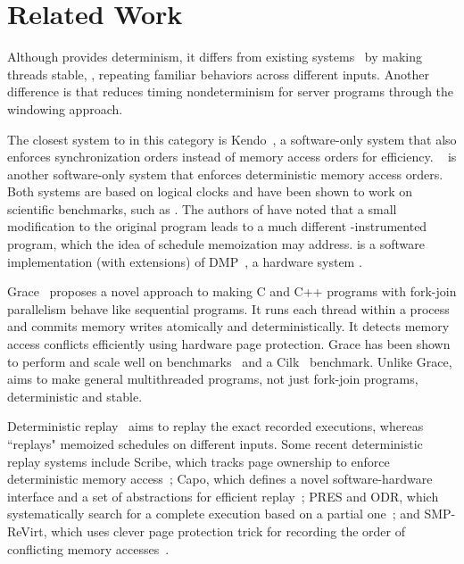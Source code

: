 \section{Related Work} \label{sec:tern-related}

 Although \tern provides determinism, it 
differs from existing \dmt systems~\cite{dmp:asplos09, coredet:asplos10, 
kendo:asplos09} by making threads stable, \ie, repeating familiar behaviors 
across different inputs. Another difference is that \tern reduces timing 
nondeterminism for server programs through the windowing approach.

The closest system to \tern in this category is
Kendo~\cite{kendo:asplos09}, a software-only \dmt system that also
enforces synchronization orders instead of memory access orders for
efficiency.  \coredet~\cite{coredet:asplos10} is another software-only \dmt
system that enforces deterministic memory access orders.  Both systems are
based on logical clocks and have been shown to work on scientific
benchmarks, such as \splash.  The authors of \coredet have noted that a small
modification to the original program leads to a much different
\coredet-instrumented program, which the idea of schedule memoization may
address.  \coredet is a software implementation (with extensions) of
DMP~\cite{dmp:asplos09}, a hardware \dmt system .

Grace~\cite{grace:oopsla09} proposes a novel approach to making C and C++
programs with fork-join parallelism behave like sequential programs.  It
runs each thread within a process and commits memory writes atomically and
deterministically.  It detects memory access conflicts efficiently using
hardware page protection.  Grace has been shown to perform and scale well
on \phoenix benchmarks~\cite{phoenix-benchmarks} and a Cilk~\cite{cilk}
benchmark.  Unlike Grace, \tern aims to make general multithreaded
programs, not just fork-join programs, deterministic and stable.

 Deterministic
replay~\cite{r2:osdi, friday2007, srinivasan:flashback, revirt, dejavu, 
vmware-record-replay, smp-revirt:vee08, pres:sosp09, scribe:sigmetrics10, 
odr:sosp09, capo:asplos09}
aims to replay the exact recorded executions, whereas \tern ``replays"
memoized schedules on different inputs.  Some recent deterministic replay
systems include Scribe, which tracks page ownership to enforce
deterministic memory access~\cite{scribe:sigmetrics10}; Capo, which defines
a novel software-hardware interface and a set of abstractions for
efficient replay~\cite{capo:asplos09}; PRES and ODR, which
systematically search for a complete execution based on a partial
one~\cite{pres:sosp09,odr:sosp09}; and SMP-ReVirt, which uses clever page
protection trick for recording the order of conflicting memory
accesses~\cite{smp-revirt:vee08}.

